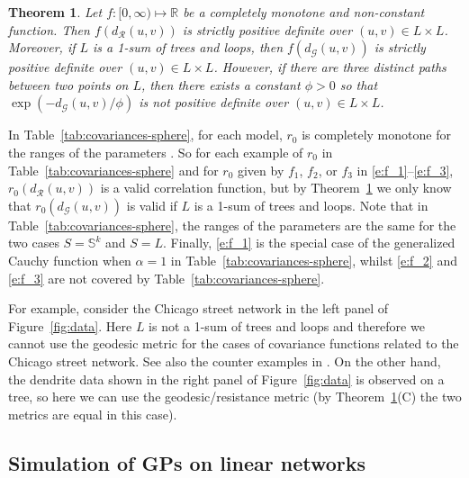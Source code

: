 \documentclass[alpha-refs]{wiley-article}
\newtheorem{thm}{Theorem}
\begin{document}

\begin{thm}\label{t:1}
Let $f : [0, \infty)\mapsto\mathbb R$ be a completely monotone and non-constant function. Then
 $f(d_{\mathcal R}(u, v))$ is strictly
positive definite over $(u, v)\in L\times L$. Moreover, if $L$ is a 1-sum of trees and loops, then $f(d_{\mathcal G}(u, v))$ is strictly
positive definite over $(u, v)\in L\times L$. However,
if there are three distinct paths between two points on $L$, then there exists a constant $\phi>0$ so that  $\exp(-d_{\mathcal G}(u, v)/\phi)$ is not positive definite over $(u, v)\in L\times L$. 
\end{thm} 

In Table~\ref{tab:covariances-sphere}, for
 each model, $r_0$ is completely monotone for the ranges of the parameters \citep[cf.\ the comments to Theorem~1 in][]{AnderesEtAl}. 
So for each example of $r_0$ in Table~\ref{tab:covariances-sphere} and for $r_0$ given by $f_1$, $f_2$, or $f_3$ in \eqref{e:f_1}--\eqref{e:f_3}, $r_0(d_{\mathcal R}(u, v))$ is a valid correlation function, but by Theorem~\ref{t:1} 
we only know that
$r_0(d_{\mathcal G}(u, v))$ is 
 valid if $L$ is a 1-sum of trees and loops. 
 Note that in Table~\ref{tab:covariances-sphere}, the ranges of the parameters are the same for the two cases $S=\mathbb S^k$ and $S=L$. Finally, \eqref{e:f_1} is the special case of the generalized Cauchy function when $\alpha=1$ in Table~\ref{tab:covariances-sphere}, whilst \eqref{e:f_2} and \eqref{e:f_3} are not covered by Table~\ref{tab:covariances-sphere}. 
 
For example, consider the Chicago street network in the left panel of Figure~\ref{fig:data}. Here $L$ is not a 1-sum of trees and loops and therefore we cannot use the geodesic metric for the cases of covariance functions related to the Chicago street network. See also the counter examples in \citet[][Section~5]{AnderesEtAl}. On the other hand, the dendrite data shown in the right panel of Figure~\ref{fig:data} is observed on a tree, so here we can use the geodesic/resistance metric (by Theorem~\ref{t:1}(C) the two metrics are equal in this case).

\subsection{Simulation of GPs on linear networks}\label{s:sim-GP} 
\end{document}
